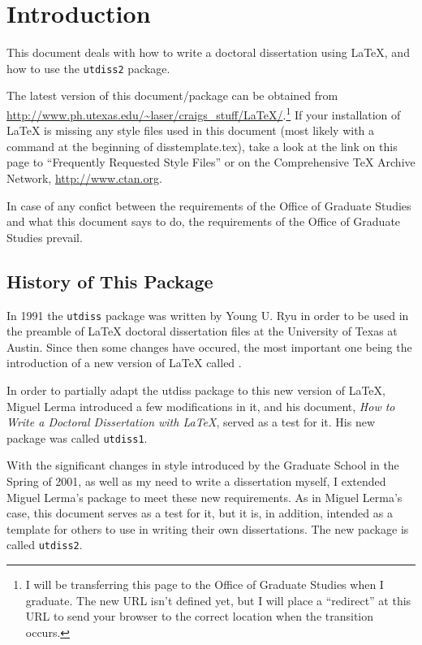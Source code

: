 \chapter{Introduction}
%


This document deals with how to write a doctoral dissertation 
using \LaTeX{}, and how to use the \texttt{utdiss2} package. 
%

The latest version of this document/package can be obtained from
\url{http://www.ph.utexas.edu/~laser/craigs_stuff/LaTeX/}.\footnote{I
will be transferring this page to the Office of Graduate
Studies when I graduate. The new URL isn't defined yet, but I will
place a ``redirect'' at this URL to send your browser to the correct
location when the transition occurs.}
If your installation of LaTeX is missing any style files used in this
document (most likely with a 
command at the beginning of disstemplate.tex), take a look at the link
on this page to ``Frequently Requested Style Files'' or on the
Comprehensive TeX Archive Network, \url{http://www.ctan.org}.

In case of any confict between the requirements of the Office of Graduate
Studies and what this document says to do, the requirements of the Office
of Graduate Studies prevail.

\section{History of This Package}
%

In 1991 the \texttt{utdiss} package was written by Young U. Ryu 
%
in order to be used in the preamble of \LaTeX{} doctoral dissertation
files at the University of Texas at Austin. 
%
Since then some changes have occured, the most important one
being the introduction of a new version of \LaTeX{} 
%
called \LaTeXe{}. 
%

In order to partially adapt the utdiss package to this new version
of \LaTeX{}, Miguel Lerma introduced a few modifications in it,
and his document, \textit{How to Write a Doctoral Dissertation
with \LaTeX{}}, served as a test for it. His new package was
called \texttt{utdiss1}.
%

With the significant changes in style introduced by the Graduate
School in the Spring of 2001, as well as  my need to write a
dissertation myself, I extended Miguel Lerma's package to meet
these new requirements. As in Miguel Lerma's case, this document
serves as a test for it, but it is, in addition, intended as a
template for others to use in writing their own dissertations.
The new package is called \texttt{utdiss2}.
%

